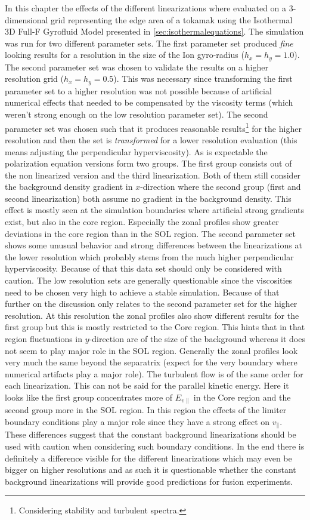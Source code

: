 \documentclass[master.tex]{subfiles}
\begin{document}
In this chapter the effects of the different linearizations where evaluated on a 3-dimensional grid representing the edge area of a tokamak using the Isothermal 3D Full-F Gyrofluid Model presented in \autoref{sec:isothermalequations}. The simulation was run for two different parameter sets. The first parameter set produced \textit{fine} looking results for a resolution in the size of the Ion gyro-radius ($h_x=h_y=1.0$). The second parameter set was chosen to validate the results on a higher resolution grid ($h_x=h_y=0.5$). This was necessary since transforming the first parameter set to a higher resolution was not possible because of artificial numerical effects that needed to be compensated by the viscosity terms (which weren't strong enough on the low resolution parameter set). The second parameter set was chosen such that it produces reasonable results\footnote{Considering stability and turbulent spectra.} for the higher resolution and then the set is \textit{transformed} for a lower resolution evaluation (this means adjusting the perpendicular hyperviscosity).\newline
As is expectable the polarization equation versions form two groups. The first group consists out of the non linearized version and the third linearization. Both of them still consider the background density gradient in $x$-direction where the second group (first and second linearization) both assume no gradient in the background density. This effect is mostly seen at the simulation boundaries where artificial strong gradients exist, but also in the core region. Especially the zonal profiles show greater deviations in the core region than in the SOL region.\newline
The second parameter set shows some unusual behavior and strong differences between the linearizations at the lower resolution which probably stems from the much higher perpendicular hyperviscosity. Because of that this data set should only be considered with caution.\newline
The low resolution sets are generally questionable since the viscosities need to be chosen very high to achieve a stable simulation. Because of that further on the discussion only relates to the second parameter set for the higher resolution.\newline
At this resolution the zonal profiles also show different results for the first group but this is mostly restricted to the Core region. This hints that in that region fluctuations in $y$-direction are of the size of the background whereas it does not seem to play major role in the \ac{SOL} region.  Generally the zonal profiles look very much the same beyond the separatrix (expect for the very boundary where numerical artifacts play a major role). The turbulent flow is of the same order for each linearization. This can not be said for the parallel kinetic energy. Here it looks like the first group concentrates more of $E_{v\parallel}$ in the Core region and the second group more in the \ac{SOL} region. In this region the effects of the limiter boundary conditions play a major role since they have a strong effect on $v_{\parallel}$. These differences suggest that the constant background linearizations should be used with caution when considering such boundary conditions.\newline
In the end there is definitely a difference visible for the different linearizations which may even be bigger on higher resolutions and as such it is questionable whether the constant background linearizations will provide good predictions for fusion experiments.
\end{document}
